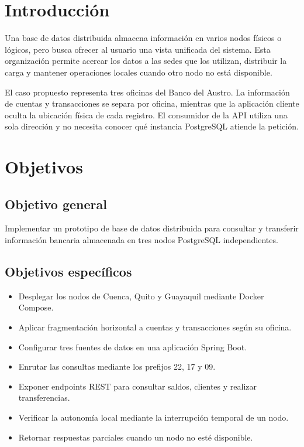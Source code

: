 \documentclass[12pt,a4paper]{article}
\begin{document}
\section{Introducción}

Una base de datos distribuida almacena información en varios nodos físicos o lógicos, pero busca ofrecer al usuario una vista unificada del sistema. Esta organización permite acercar los datos a las sedes que los utilizan, distribuir la carga y mantener operaciones locales cuando otro nodo no está disponible.

El caso propuesto representa tres oficinas del Banco del Austro. La información de cuentas y transacciones se separa por oficina, mientras que la aplicación cliente oculta la ubicación física de cada registro. El consumidor de la API utiliza una sola dirección y no necesita conocer qué instancia PostgreSQL atiende la petición.

\section{Objetivos}

\subsection{Objetivo general}

Implementar un prototipo de base de datos distribuida para consultar y transferir información bancaria almacenada en tres nodos PostgreSQL independientes.

\subsection{Objetivos específicos}

\begin{itemize}
  \item Desplegar los nodos de Cuenca, Quito y Guayaquil mediante Docker Compose.
  \item Aplicar fragmentación horizontal a cuentas y transacciones según su oficina.
  \item Configurar tres fuentes de datos en una aplicación Spring Boot.
  \item Enrutar las consultas mediante los prefijos 22, 17 y 09.
  \item Exponer endpoints REST para consultar saldos, clientes y realizar transferencias.
  \item Verificar la autonomía local mediante la interrupción temporal de un nodo.
  \item Retornar respuestas parciales cuando un nodo no esté disponible.
\end{itemize}
\end{document}
